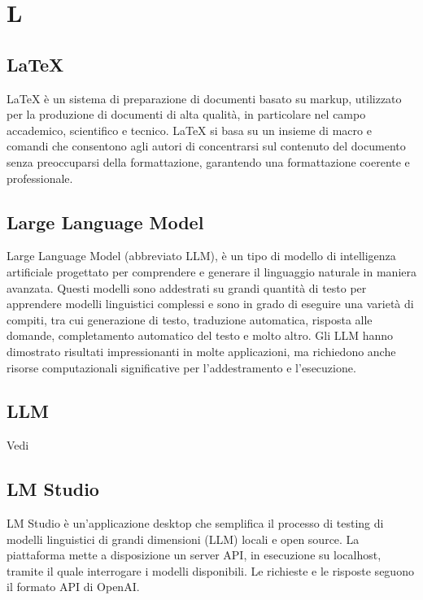\section{L}

\vspace{2em}
\subsection*{LaTeX}
\par LaTeX è un sistema di preparazione di documenti basato su markup, utilizzato per la produzione di documenti di alta qualità, in particolare nel campo accademico, scientifico e tecnico. LaTeX si basa su un insieme di macro e comandi che consentono agli autori di concentrarsi sul contenuto del documento senza preoccuparsi della formattazione, garantendo una formattazione coerente e professionale.

\vspace{2em}
\subsection*{Large Language Model}
\par Large Language Model (abbreviato LLM), è un tipo di modello di intelligenza artificiale progettato per comprendere e generare il linguaggio naturale in maniera avanzata. Questi modelli sono addestrati su grandi quantità di testo per apprendere modelli linguistici complessi e sono in grado di eseguire una varietà di compiti, tra cui generazione di testo, traduzione automatica, risposta alle domande, completamento automatico del testo e molto altro. Gli LLM hanno dimostrato risultati impressionanti in molte applicazioni, ma richiedono anche risorse computazionali significative per l'addestramento e l'esecuzione.

\vspace{2em}
\subsection*{LLM}
\par Vedi 

\vspace{2em}
\subsection*{LM Studio}
\par LM Studio è un'applicazione desktop che semplifica il processo di testing di modelli linguistici di grandi dimensioni (LLM) locali e open source. La piattaforma mette a disposizione un server API, in esecuzione su localhost, tramite il quale interrogare i modelli disponibili. Le richieste e le risposte seguono il formato API di OpenAI.

